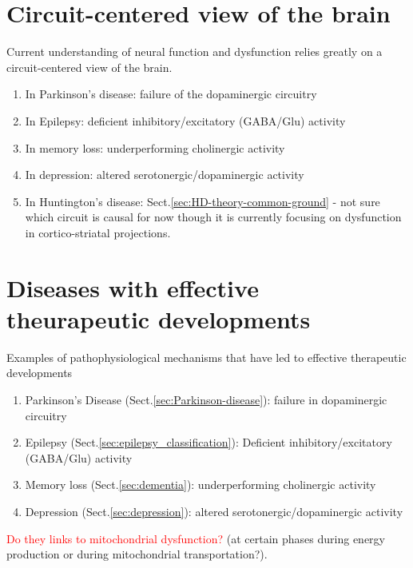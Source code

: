 \section{Circuit-centered view of the brain}
\label{sec:brain-disease-circuit-level}


Current understanding of neural function and dysfunction relies greatly on a
circuit-centered view of the brain.
\begin{enumerate}
  \item In Parkinson's disease:
  failure of the dopaminergic circuitry
  
  \item In Epilepsy:
  deficient inhibitory/excitatory (GABA/Glu) activity
  
  \item In memory loss:
  underperforming cholinergic activity
  
  \item In depression: 
  altered serotonergic/dopaminergic activity
  
  \item In Huntington's disease: Sect.\ref{sec:HD-theory-common-ground} 
  - not sure which circuit is causal for now though it is currently focusing
  on dysfunction in cortico-striatal projections. 
  
\end{enumerate}


\section{Diseases with effective theurapeutic developments}

Examples of pathophysiological mechanisms that have led to effective therapeutic
developments
\begin{enumerate}
  \item Parkinson's Disease (Sect.\ref{sec:Parkinson-disease}): failure in
  dopaminergic circuitry
  
  
  \item Epilepsy (Sect.\ref{sec:epilepsy_classification}): Deficient
  inhibitory/excitatory (GABA/Glu) activity
  
  \item Memory loss (Sect.\ref{sec:dementia}): underperforming cholinergic
  activity

  \item Depression (Sect.\ref{sec:depression}): altered
  serotonergic/dopaminergic activity
\end{enumerate}
\textcolor{red}{Do they links to mitochondrial dysfunction?} (at certain phases
during energy production or during mitochondrial transportation?).

